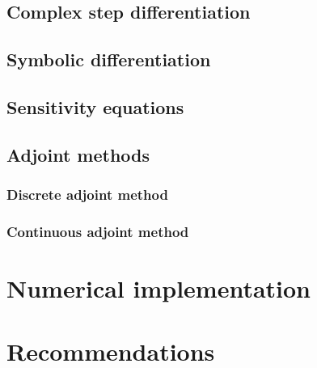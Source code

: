 \documentclass[12pt]{article}
\begin{document}
\subsection{Complex step differentiation}


\subsection{Symbolic differentiation}


\subsection{Sensitivity equations}
\label{section:sensitivity-equation}


\subsection{Adjoint methods}
\label{section:adjoint-methods}


\subsubsection{Discrete adjoint method}


\subsubsection{Continuous adjoint method}


\section{Numerical implementation}
\label{sec:computational-implementation}




\section{Recommendations}


% 
\end{document}
